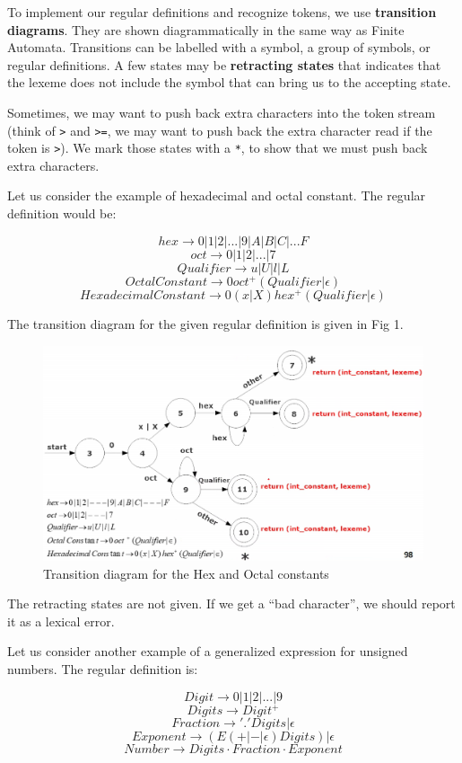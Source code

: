 \documentclass[12pt,letterpaper]{article}
\begin{document}
To implement our regular definitions and recognize tokens, we use \textbf{transition diagrams}. They are shown diagrammatically in the same way as Finite Automata. Transitions can be labelled with a symbol, a group of symbols, or regular definitions. A few states may be \textbf{retracting states} that indicates that the lexeme does not include the symbol that can bring us to the accepting state.

Sometimes, we may want to push back extra characters into the token stream (think of \texttt{>} and \texttt{>=}, we may want to push back the extra character read if the token is \texttt{>}). We mark those states with a \texttt{*}, to show that we must push back extra characters.

Let us consider the example of hexadecimal and octal constant. The regular definition would be:

\[hex \rightarrow 0|1|2|...|9|A|B|C|...F\]
\[oct \rightarrow 0|1|2|...|7\]
\[Qualifier \rightarrow u|U|l|L\]
\[OctalConstant\rightarrow 0 oct^+(Qualifier|\epsilon)\]
\[HexadecimalConstant\rightarrow 0(x|X)hex^+(Qualifier|\epsilon)\]

The transition diagram for the given regular definition is given in Fig 1.

\begin{figure}[htpb]
  \centering
  \includegraphics[width=0.8\linewidth]{./assets/hex_oct_trans_diag.png}
  \caption{Transition diagram for the Hex and Octal constants}%
  \label{fig:}
\end{figure}

The retracting states are not given. If we get a ``bad character'', we should report it as a lexical error.

Let us consider another example of a generalized expression for unsigned numbers. The regular definition is:

\[Digit \rightarrow 0|1|2|...|9\]
\[Digits \rightarrow Digit^+\]
\[Fraction \rightarrow '.'Digits|\epsilon\]
\[Exponent \rightarrow (E(+|-|\epsilon)Digits)|\epsilon\]
\[Number \rightarrow Digits \cdot Fraction \cdot Exponent\]
\end{document}
